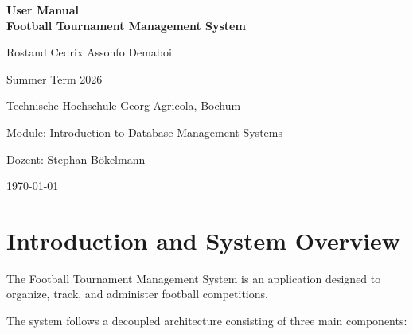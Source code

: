 \documentclass[12pt,a4paper]{article}
\begin{document}

\begin{titlepage}
\centering

\vspace*{2cm}

{\Huge\bfseries
User Manual\\[0.5cm]
Football Tournament Management System
}

\vspace{2cm}

{\Large
Rostand Cedrix Assonfo Demaboi
}

\vspace{0.5cm}

{\large
Summer Term 2026
}

\vfill

{\large
Technische Hochschule Georg Agricola, Bochum
}

\vspace{0.5cm}

{\large
Module: Introduction to Database Management Systems
}

\vspace{0.5cm}

{\large
Dozent: Stephan Bökelmann
}

\vfill

{\large
\today
}

\end{titlepage}



\clearpage
\tableofcontents
\clearpage



\section{Introduction and System Overview}

The Football Tournament Management System is an application
designed to organize, track, and administer football
competitions.

The system follows a decoupled architecture consisting of
three main components:
\end{document}
